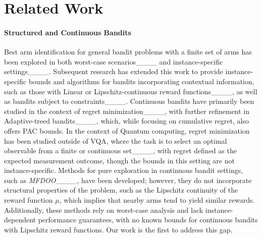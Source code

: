 \section{Related Work}
\label{sec:related_work}
\paragraph*{Structured and Continuous Bandits}
Best arm identification for general bandit problems with a finite set of arms has been explored in both worst-case scenarios____ and instance-specific settings____. Subsequent research has extended this work to provide instance-specific bounds and algorithms for bandits incorporating contextual information, such as those with Linear or Lipschitz-continuous reward functions____, as well as bandits subject to constraints____. Continuous bandits have primarily been studied in the context of regret minimization____, with further refinement in Adaptive-treed bandits____, which, while focusing on cumulative regret, also offers PAC bounds. In the context of Quantum computing, regret minimization has been studied outside of VQA, where the task is to select an optimal observable from a finite or continuous set____, with regret defined as the expected measurement outcome, though the bounds in this setting are not instance-specific. Methods for pure exploration in continuous bandit settings, such as \emph{MFDOO}____, have been developed; however, they do not incorporate structural properties of the problem, such as the Lipschitz continuity of the reward function $\mu$, which implies that nearby arms tend to yield similar rewards. Additionally, these methods rely on worst-case analysis and lack instance-dependent performance guarantees, with no known bounds for continuous bandits with Lipschitz reward functions. Our work is the first to address this gap.
\vspace{-3mm}
